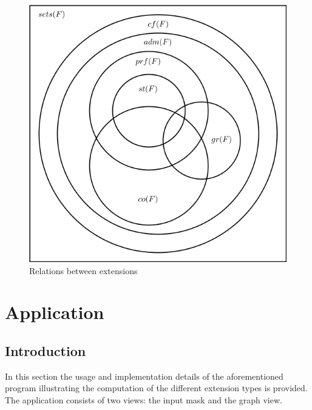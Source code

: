 \documentclass[draft,final]{vutinfth} %
\begin{document}
\FloatBarrier
	\begin{figure}[!htb]
		\centering
		\includegraphics[scale=0.6]{pics/diagram.png}
		\caption{Relations between extensions}
	\end{figure}
\FloatBarrier

\chapter{Application}

\section{Introduction}
In this section the usage and implementation details of the aforementioned program illustrating the computation of the different extension types is provided. The application consists of two views: the input mask and the graph view.
\end{document}
